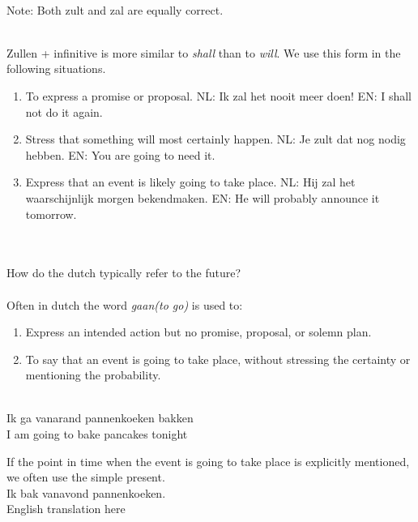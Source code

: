 \documentclass[letterpaper,11pt]{article}
\begin{document}
\\
Note: Both zult and zal are equally correct.\\
\\
\par{Zullen + infinitive is more similar to \textit{shall} than to
\textit{will}. We use this form in the following situations.}
\begin{enumerate}[topsep=0pt, parsep=0pt, partopsep=0pt, itemsep=0pt]
    \item To express a promise or proposal.
        \subitem \small{NL: Ik zal het nooit meer doen!} 
        \subitem \small{EN: I shall not do it again.} 
    \item Stress that something will most certainly happen.
        \subitem \small{NL: Je zult dat nog nodig hebben.} 
        \subitem \small{EN: You are going to need it.} 
    \item Express that an event is likely going to take place.
        \subitem \small{NL: Hij zal het waarschijnlijk morgen bekendmaken.} 
        \subitem \small{EN: He will probably announce it tomorrow.} 
\end{enumerate}
\\ \\
How do the dutch typically refer to the future? \\ \\
Often in dutch the word \textit{gaan(to go)} is used to:
\begin{enumerate}[topsep=0pt, parsep=0pt, partopsep=0pt, itemsep=0pt]
    \item Express an intended action but no promise, proposal, or solemn plan.
    \item To say that an event is going to take place, without stressing the
        certainty or mentioning the probability.
\end{enumerate}
\\
Ik ga vanarand pannenkoeken bakken \\
I am going to bake pancakes tonight \\
\par{If the point in time when the event is going to take place is explicitly
mentioned, we often use the simple present.}
\\
Ik bak vanavond pannenkoeken. \\
English translation here \\
\\ \\
\end{document}
